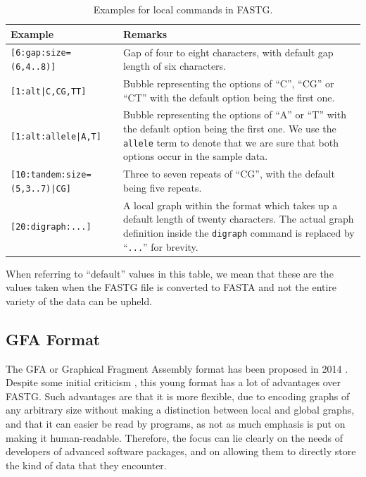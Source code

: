 \documentclass[a4paper,12pt,twoside,BCOR=10mm]{scrbook}
\begin{document}
\begin{table}[htb]
\centering
\caption[Local commands in FASTG]{Examples for local commands in FASTG.}
\begin{tabularx}{1.0\textwidth}{ | l | X | }
\hline
\textbf{Example} & \textbf{Remarks} \\
\hline
\texttt{[6:gap:size=(6,4..8)]} & Gap of four to eight characters, with default gap length of six characters. \\
\hline
\texttt{[1:alt|C,CG,TT]} & Bubble representing the options of “C”, “CG” or “CT” with the default option being the first one. \\
\hline
\texttt{[1:alt:allele|A,T]} & Bubble representing the options of “A” or “T” with the default option being the first one. We use the \texttt{allele} term to denote that we are sure that both options occur in the sample data. \\
\hline
\texttt{[10:tandem:size=(5,3..7)|CG]} & Three to seven repeats of “CG”, with the default being five repeats. \\
\hline
\texttt{[20:digraph:...]} & A local graph within the format which takes up a default length of twenty characters. The actual graph definition inside the \texttt{digraph} command is replaced by “\texttt{...}” for brevity. \\
\hline
\end{tabularx}
\label{table:fastg_local_examples}
\end{table}

When referring to “default” values in this table, we mean that these are the values taken when the FASTG file
is converted to FASTA and not the entire variety of the data can be upheld.

\subsection{GFA Format}

The GFA or Graphical Fragment Assembly format
has been proposed in 2014 \citep{specGFA1,specGFA2}.
Despite some initial criticism \citep{knightGFA1},
this young format has a lot of advantages over FASTG.
Such advantages are that
it is more flexible, due to encoding graphs of any arbitrary size without
making a distinction between local and global graphs, and that it can easier be read by programs,
as not as much emphasis is put on making it human-readable.
Therefore, the focus can lie clearly on the needs of developers of advanced software packages,
and on allowing them to directly store the kind of data that they encounter.
\end{document}
